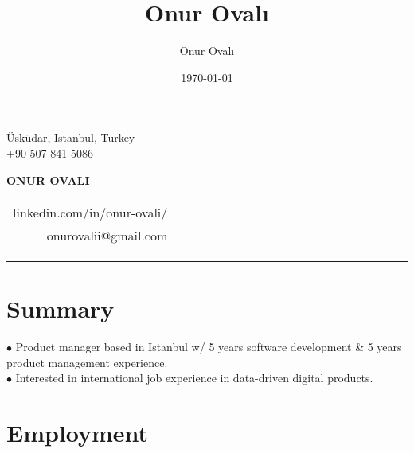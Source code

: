 \documentclass[11pt,twoside,a4paper]{article}
\title{Onur Ovalı}
\author{Onur Ovalı}
\date{\today}
\makeatletter
\newcommand\textbox[1]{%
  \parbox{.333\textwidth}{#1} %
}
\renewcommand\maketitle
{\noindent
 {\textbf{Üsküdar, Istanbul, Turkey}}%
 \medskip\par\noindent
 {\textbf{linkedin.com/in/onur-ovali}}%
 \hfill
 {\large\@date}%
 \bigskip\par\noindent
}
\makeatother
\begin{document}


  \noindent\textbox{Üsküdar, Istanbul, Turkey \\+90 507 841 5086\hfill}
  \textbox{\hfil\Large\bfseries ONUR OVALI\hfil}
  \textbox
    {\hfill \begin{tabular}[c]{r}
      linkedin.com/in/onur-ovali/ \\
      onurovalii@gmail.com
    \end{tabular}
    }

  \hrule

  \section{Summary}
  $\bullet$ Product manager based in Istanbul w/ 5 years software development \& 5 years product management experience.\\
  $\bullet$ Interested in international job experience in data-driven digital products.

  \section{Employment}
\end{document}

